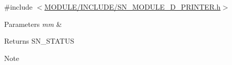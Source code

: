 {\ttfamily \#include $<$\hyperlink{SN__MODULE__3D__PRINTER_8h}{M\+O\+D\+U\+L\+E/\+I\+N\+C\+L\+U\+D\+E/\+S\+N\+\_\+\+M\+O\+D\+U\+L\+E\+\_\+D\+\_\+\+P\+R\+I\+N\+T\+E\+R.\+h}$>$}


\begin{DoxyParams}{Parameters}
{\em mm} & \\
\hline
\end{DoxyParams}
\begin{DoxyReturn}{Returns}
S\+N\+\_\+\+S\+T\+A\+T\+US
\end{DoxyReturn}
\begin{DoxyNote}{Note}

\end{DoxyNote}

